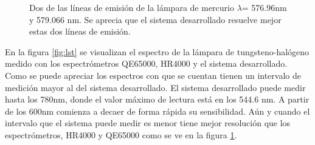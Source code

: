 \begin{figure}[h]
	\centering
	\caption{Dos de las líneas de emisión de la lámpara de mercurio $\lambda$= 576.96nm y 579.066 nm. Se aprecia que el sistema desarrollado resuelve mejor estas dos líneas de emisión.}
	\label{fig:lineasdos}
\end{figure}


En la figura \ref{fig:lst} se visualizan el espectro de la lámpara de tungsteno-halógeno medido con los espectrómetros QE65000, HR4000 y el sistema desarrollado. Como se puede apreciar los espectros con que se cuentan tienen un intervalo de medición mayor al del sistema desarrollado. 
El sistema desarrollado puede medir hasta los 780nm, donde el valor máximo de lectura está en los 544.6 nm. A partir de los 600nm comienza a decaer de forma rápida su sensibilidad. Aún y cuando  el intervalo que el sistema puede medir es menor tiene mejor resolución que los espectrómetros, HR4000 y QE65000 como se ve en la figura \ref{fig:lineasdos}.

